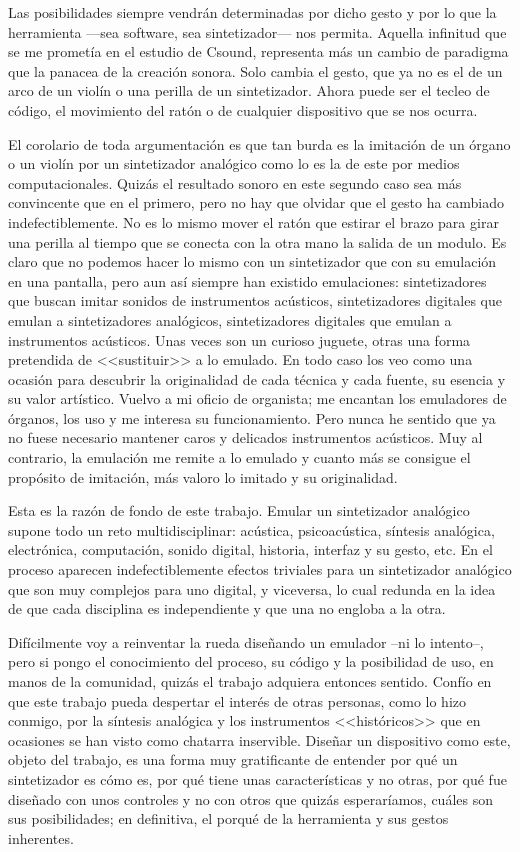 Las posibilidades siempre vendrán determinadas por dicho gesto y por lo que la herramienta ---sea software, sea sintetizador--- nos permita. Aquella infinitud que se me prometía en el estudio de Csound, representa más un cambio de paradigma que la panacea de la creación sonora. Solo cambia el gesto, que ya no es el de un arco de un violín o una perilla de un sintetizador. Ahora puede ser el tecleo de código, el movimiento del ratón o de cualquier dispositivo que se nos ocurra. 

El corolario de toda argumentación es que tan burda es la imitación de un órgano o un violín por un sintetizador analógico como lo es la de este por medios computacionales. Quizás el resultado sonoro en este segundo caso sea más convincente que en el primero, pero no hay que olvidar que el gesto ha cambiado indefectiblemente. No es lo mismo mover el ratón que estirar el brazo para girar una perilla al tiempo que se conecta con la otra mano la salida de un modulo. Es claro que no podemos hacer lo mismo con un sintetizador que con su emulación en una pantalla, pero aun así siempre han existido emulaciones: sintetizadores que buscan imitar sonidos de instrumentos acústicos, sintetizadores digitales que emulan a sintetizadores analógicos, sintetizadores digitales que emulan a instrumentos acústicos. Unas veces son un curioso juguete, otras una forma pretendida de <<sustituir>> a lo emulado. En todo caso los veo como una ocasión para descubrir la originalidad de cada técnica y cada fuente, su esencia y su valor artístico. Vuelvo a mi oficio de organista; me encantan los emuladores de órganos, los uso y me interesa su funcionamiento. Pero nunca he sentido que ya no fuese necesario mantener caros y delicados instrumentos acústicos. Muy al contrario, la emulación me remite a lo emulado y cuanto más se consigue el propósito de imitación, más valoro lo imitado y su originalidad.

Esta es la razón de fondo de este trabajo. Emular un sintetizador analógico supone todo un reto multidisciplinar: acústica, psicoacústica, síntesis analógica, electrónica, computación, sonido digital, historia, interfaz y su gesto, etc. En el proceso aparecen indefectiblemente efectos triviales para un sintetizador analógico que son muy complejos para uno digital, y viceversa, lo cual redunda en la idea de que cada disciplina es independiente y que una no engloba a la otra. 

Difícilmente voy a reinventar la rueda diseñando un emulador --ni lo intento--, pero si pongo el conocimiento del proceso, su código y la posibilidad de uso, en manos de la comunidad, quizás el trabajo adquiera entonces sentido. Confío en que este trabajo pueda despertar el interés de otras personas, como lo hizo conmigo, por la síntesis analógica y los instrumentos <<históricos>> que en ocasiones se han visto como chatarra inservible. Diseñar un dispositivo como este, objeto del trabajo, es una forma muy gratificante de entender por qué un sintetizador es cómo es, por qué tiene unas características y no otras, por qué fue diseñado con unos controles y no con otros que quizás esperaríamos, cuáles son sus posibilidades; en definitiva, el porqué de la herramienta y sus gestos inherentes.

